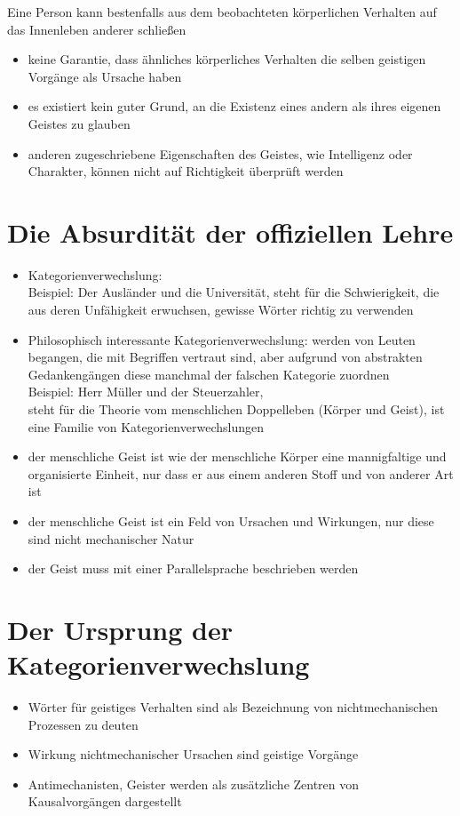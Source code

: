 \documentclass[landscape, twocolumn]{scrartcl}
\begin{document}
\noindent Eine Person kann bestenfalls aus dem beobachteten körperlichen Verhalten auf das Innenleben anderer schließen
\begin{itemize}
    \item
        keine Garantie, dass ähnliches körperliches Verhalten die selben geistigen Vorgänge als Ursache haben
    \item
        es existiert kein guter Grund, an die Existenz eines andern als ihres eigenen Geistes zu glauben
    \item
        anderen zugeschriebene Eigenschaften des Geistes, wie Intelligenz oder Charakter, können nicht auf Richtigkeit überprüft werden
\end{itemize}

\section{Die Absurdität der offiziellen Lehre}
\begin{itemize}
    \item
        Kategorienverwechslung:\\
        Beispiel: Der Ausländer und die Universität, steht für die Schwierigkeit, die aus deren Unfähigkeit erwuchsen, gewisse Wörter richtig zu verwenden
    \item
        Philosophisch interessante Kategorienverwechslung: werden von Leuten begangen, die mit Begriffen vertraut sind, aber aufgrund von abstrakten Gedankengängen diese manchmal der falschen Kategorie zuordnen\\
        Beispiel: Herr Müller und der Steuerzahler,\\
        steht für die Theorie vom menschlichen Doppelleben (Körper und Geist), ist eine Familie von Kategorienverwechslungen
    \item
        der menschliche Geist ist wie der menschliche Körper eine mannigfaltige und organisierte Einheit, nur dass er aus einem anderen Stoff und von anderer Art ist
    \item
        der menschliche Geist ist ein Feld von Ursachen und Wirkungen, nur diese sind nicht mechanischer Natur
    \item
        der Geist muss mit einer Parallelsprache beschrieben werden
\end{itemize}

\section{Der Ursprung der Kategorienverwechslung}
\begin{itemize}
    \item
        Wörter für geistiges Verhalten sind als Bezeichnung von nichtmechanischen Prozessen zu deuten
    \item
        Wirkung nichtmechanischer Ursachen sind geistige Vorgänge
    \item
        Antimechanisten, Geister werden als zusätzliche Zentren von Kausalvorgängen dargestellt
\end{itemize}
\end{document}
